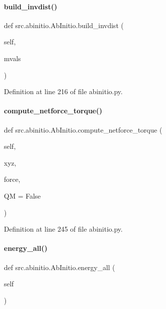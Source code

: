 \paragraph{\texorpdfstring{build\+\_\+invdist()}{build\_invdist()}}
{\footnotesize\ttfamily def src.\+abinitio.\+Ab\+Initio.\+build\+\_\+invdist (\begin{DoxyParamCaption}\item[{}]{self,  }\item[{}]{mvals }\end{DoxyParamCaption})}



Definition at line 216 of file abinitio.\+py.

\mbox{\label{classsrc_1_1abinitio_1_1AbInitio_a47d99a795699735638d55c5162ef1878}} 
\paragraph{\texorpdfstring{compute\+\_\+netforce\+\_\+torque()}{compute\_netforce\_torque()}}
{\footnotesize\ttfamily def src.\+abinitio.\+Ab\+Initio.\+compute\+\_\+netforce\+\_\+torque (\begin{DoxyParamCaption}\item[{}]{self,  }\item[{}]{xyz,  }\item[{}]{force,  }\item[{}]{QM = {\ttfamily False} }\end{DoxyParamCaption})}



Definition at line 245 of file abinitio.\+py.

\mbox{\label{classsrc_1_1abinitio_1_1AbInitio_ad034ceabe8571ffd60c3c8f33cb86c85}} 
\paragraph{\texorpdfstring{energy\+\_\+all()}{energy\_all()}}
{\footnotesize\ttfamily def src.\+abinitio.\+Ab\+Initio.\+energy\+\_\+all (\begin{DoxyParamCaption}\item[{}]{self }\end{DoxyParamCaption})}



